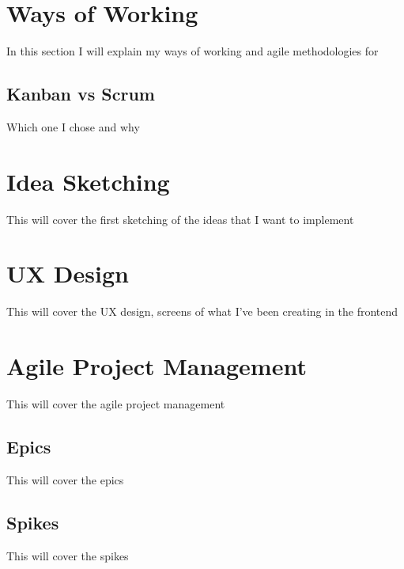 \section{Ways of Working}
\label{s:Ways-of-Working}
In this section I will explain my ways of working and agile methodologies for

\subsection{Kanban vs Scrum}
\label{s:Kanban-vs-Scrum}
Which one I chose and why

\section{Idea Sketching}
\label{s:Idea-Sketching}
This will cover the first sketching of the ideas that I want to implement

\section{UX Design}
\label{s:UX-Design}
This will cover the UX design, screens of what I've been creating in the frontend

\section{Agile Project Management}
\label{s:Agile-Project-Management}
This will cover the agile project management

\subsection{Epics}
\label{s:Epic}
This will cover the epics

\subsection{Spikes}
\label{s:Kanban-vs-Scrum}
This will cover the spikes
